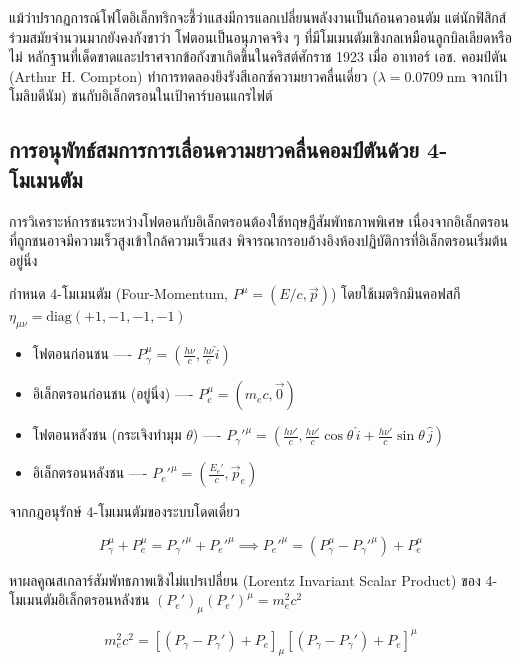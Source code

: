 แม้ว่าปรากฏการณ์โฟโตอิเล็กทริกจะชี้ว่าแสงมีการแลกเปลี่ยนพลังงานเป็นก้อนควอนตัม แต่นักฟิสิกส์ร่วมสมัยจำนวนมากยังคงกังขาว่า โฟตอนเป็นอนุภาคจริง ๆ ที่มีโมเมนตัมเชิงกลเหมือนลูกบิลเลียดหรือไม่ หลักฐานที่เด็ดขาดและปราศจากข้อกังขาเกิดขึ้นในคริสต์ศักราช 1923 เมื่อ อาเทอร์ เอช. คอมป์ตัน (Arthur H. Compton) ทำการทดลองยิงรังสีเอกซ์ความยาวคลื่นเดี่ยว ($\lambda = 0.0709~\text{nm}$ จากเป้าโมลิบดีนัม) ชนกับอิเล็กตรอนในเป้าคาร์บอนแกรไฟต์

\subsection{การอนุพัทธ์สมการการเลื่อนความยาวคลื่นคอมป์ตันด้วย 4-โมเมนตัม}

การวิเคราะห์การชนระหว่างโฟตอนกับอิเล็กตรอนต้องใช้ทฤษฎีสัมพัทธภาพพิเศษ เนื่องจากอิเล็กตรอนที่ถูกชนอาจมีความเร็วสูงเข้าใกล้ความเร็วแสง พิจารณากรอบอ้างอิงห้องปฏิบัติการที่อิเล็กตรอนเริ่มต้นอยู่นิ่ง

กำหนด 4-โมเมนตัม (Four-Momentum, $P^\mu = (E/c, \vec{p})$) โดยใช้เมตริกมินคอฟสกี $\eta_{\mu\nu} = \text{diag}(+1, -1, -1, -1)$
\begin{itemize}
    \item โฟตอนก่อนชน ---- $P_\gamma^\mu = \left( \frac{h\nu}{c}, \frac{h\nu}{c}\hat{i} \right)$
    \item อิเล็กตรอนก่อนชน (อยู่นิ่ง) ---- $P_e^\mu = (m_e c, \vec{0})$
    \item โฟตอนหลังชน (กระเจิงทำมุม $\theta$) ---- $P_\gamma'^\mu = \left( \frac{h\nu'}{c}, \frac{h\nu'}{c}\cos\theta\,\hat{i} + \frac{h\nu'}{c}\sin\theta\,\hat{j} \right)$
    \item อิเล็กตรอนหลังชน ---- $P_e'^\mu = \left( \frac{E_e'}{c}, \vec{p}_e \right)$
\end{itemize}

จากกฎอนุรักษ์ 4-โมเมนตัมของระบบโดดเดี่ยว

\begin{equation}
P_\gamma^\mu + P_e^\mu = P_\gamma'^\mu + P_e'^\mu \implies P_e'^\mu = (P_\gamma^\mu - P_\gamma'^\mu) + P_e^\mu
\label{eq:four_momentum_conservation}
\end{equation}

หาผลคูณสเกลาร์สัมพัทธภาพเชิงไม่แปรเปลี่ยน (Lorentz Invariant Scalar Product) ของ 4-โมเมนตัมอิเล็กตรอนหลังชน $(P_e')_\mu (P_e')^\mu = m_e^2 c^2$

\begin{equation}
m_e^2 c^2 = \left[ (P_\gamma - P_\gamma') + P_e \right]_\mu \left[ (P_\gamma - P_\gamma') + P_e \right]^\mu
\end{equation}

